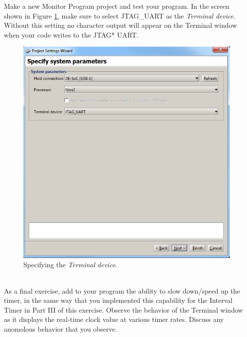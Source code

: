 \documentclass[epsfig,10pt,fullpage]{article}
\newcommand{\CommonDocsPath}{../../../../common/docs}
\begin{document}
\noindent
Make a new Monitor Program project and test your program. In the screen shown in Figure
\ref{fig:terminal}, make sure to select {\sf JTAG\_UART} as the {\it Terminal
device}. Without this setting no character output will appear on the Terminal window when 
your code writes to the JTAG* UART.

\begin{figure}[htb]
	\begin{center}
	\includegraphics[scale=0.58]{figures/terminal.png}
	\end{center}
	\vspace{-0.25cm}\caption{Specifying the {\it Terminal device}.}
\label{fig:terminal}
\end{figure}

~\\
\noindent
As a final exercise, add to your program the ability to slow down/speed up the  
timer, in the same way that you implemented this capability for the Interval Timer in Part III
of this exercise. Observe the behavior of the Terminal window as it displays the real-time 
clock value at various timer rates.  Discuss any anomolous behavior that you observe.



\end{document}
